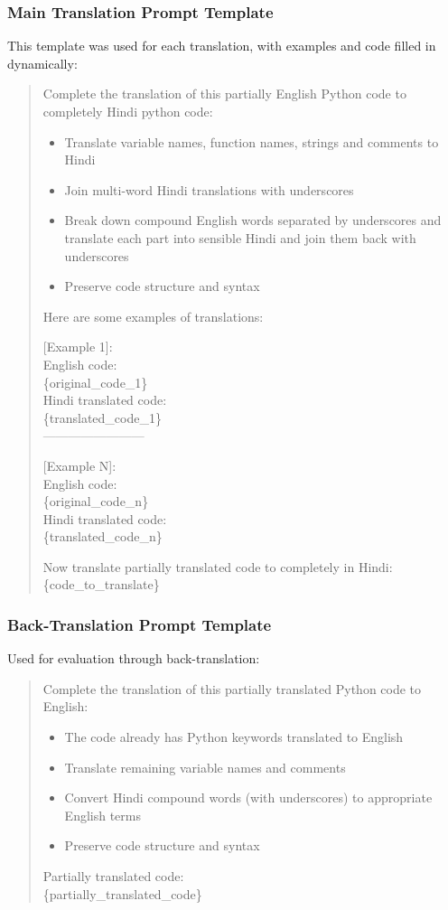\documentclass[11pt,a4paper]{article}
\begin{document}
\subsubsection{Main Translation Prompt Template}
This template was used for each translation, with examples and code filled in dynamically:
\begin{quote}
Complete the translation of this partially English Python code to completely Hindi python code:
\begin{itemize}
\item Translate variable names, function names, strings and comments to Hindi
\item Join multi-word Hindi translations with underscores
\item Break down compound English words separated by underscores and translate each part into sensible Hindi and join them back with underscores
\item Preserve code structure and syntax
\end{itemize}

Here are some examples of translations:

[Example 1]:\\
English code:\\
\{original\_code\_1\}\\
Hindi translated code:\\
\{translated\_code\_1\}\\
------------------------

[Example N]:\\
English code:\\
\{original\_code\_n\}\\
Hindi translated code:\\
\{translated\_code\_n\}

Now translate partially translated code to completely in Hindi:\\
\{code\_to\_translate\}
\end{quote}

\subsubsection{Back-Translation Prompt Template}
Used for evaluation through back-translation:
\begin{quote}
Complete the translation of this partially translated Python code to English:
\begin{itemize}
\item The code already has Python keywords translated to English
\item Translate remaining variable names and comments
\item Convert Hindi compound words (with underscores) to appropriate English terms
\item Preserve code structure and syntax
\end{itemize}

Partially translated code:\\
\{partially\_translated\_code\}
\end{quote}
\end{document}
